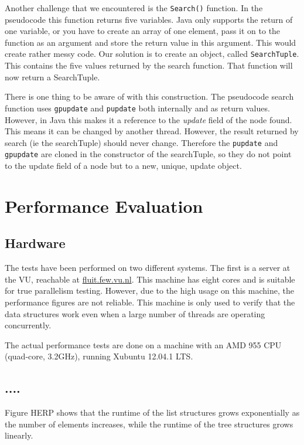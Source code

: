\documentclass[a4paper]{article}
\begin{document}
Another challenge that we encountered is the \texttt{Search()} function. In the pseudocode
this function returns five variables. Java only supports the return of one variable, or
you have to create an array of one element, pass it on to the function as an argument and
store the return value in this argument. This would create rather messy code. Our solution
is to create an object, called \texttt{SearchTuple}. This contains the five values
returned by the search function. That function will now return a SearchTuple.

There is one thing to be aware of with this construction. The pseudocode search function
uses \texttt{gpupdate} and \texttt{pupdate} both internally and as return values. However,
in Java this makes it a reference to the \emph{update} field of the node found. This means
it can be changed by another thread. However, the result returned by search (ie the
searchTuple) should never change. Therefore the \texttt{pupdate} and \texttt{gpupdate} are
cloned in the constructor of the searchTuple, so they do not point to the update field of
a node but to a new, unique, update object.

\section{Performance Evaluation}

\subsection{Hardware}

The tests have been performed on two different systems. The first is a server
at the VU, reachable at \url{fluit.few.vu.nl}. This machine has eight cores and
is suitable for true parallelism testing. However, due to the high usage on
this machine, the performance figures are not reliable. This machine is only
used to verify that the data structures work even when a large number of
threads are operating concurrently.

The actual performance tests are done on a machine with an AMD 955 CPU
(quad-core, 3.2GHz), running Xubuntu 12.04.1 LTS.

\subsection{....}

Figure HERP shows that the runtime of the list structures grows exponentially
as the number of elements increases, while the runtime of the tree structures
grows linearly.
\end{document}
